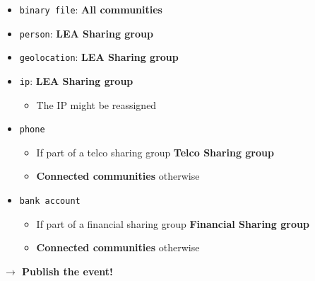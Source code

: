 \begin{frame}
    \begin{itemize}
        \item \texttt{binary file}: \textbf{All communities}
        \item \texttt{person}: \textbf{LEA Sharing group}
        \item \texttt{geolocation}: \textbf{LEA Sharing group}
        \item \texttt{ip}: \textbf{LEA Sharing group}
        \begin{itemize}
            \item The IP might be reassigned
        \end{itemize}
        \item \texttt{phone}
        \begin{itemize}
            \item If part of a telco sharing group \textbf{Telco Sharing group}
            \item \textbf{Connected communities} otherwise
        \end{itemize}
        \item \texttt{bank account}
        \begin{itemize}
            \item If part of a financial sharing group \textbf{Financial Sharing group}
            \item \textbf{Connected communities} otherwise
        \end{itemize}
    \end{itemize}
    \begin{center}
        \textbf{$\rightarrow$ Publish the event!}
    \end{center}
\end{frame}


%
%
%
%

